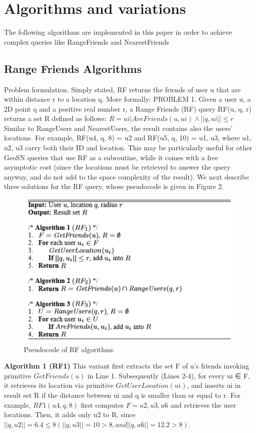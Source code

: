 \documentclass[prodmode,acmtods]{acmsmall} %
\begin{document}
\section{Algorithms and variations}
The following algorithms are implemented in this paper in order to achieve complex queries like RangeFriends and NearestFriends

\subsection{Range Friends Algorithms}
Problem formulation. Simply stated, RF returns the friends of
user u that are within distance r to a location q. More formally:
PROBLEM 1. Given a user u, a 2D point q and a positive real
number r, a Range Friends (RF) query RF(u, q, r) returns a set
R defined as follows:
\newline
\newline
$  R = {ui | AreFriends(u, ui) ∧ ||q, ui|| ≤ r} $
\newline
\newline
Similar to RangeUsers and NearestUsers, the result contains
also the users’ locations. For example, RF(u4, q, 8) = {u2} and
RF(u5, q, 10) = {u1, u3}, where u1, u2, u3 carry both their ID
and location. This may be particularly useful for other GeoSN
queries that use RF as a subroutine, while it comes with a free
asymptotic cost (since the locations must be retrieved to answer the
query anyway, and do not add to the space complexity of the result).
We next describe three solutions for the RF query, whose pseudocode
is given in Figure 2.

\begin{figure}[h]
\centering
\includegraphics[width=0.7\linewidth]{./graphics/RF_algorithm}
\caption{Pseudocode of RF algorithms}
\label{fig:RF_algorithm}
\end{figure}


\textbf{Algorithm 1 (RF1)}
\newline
This variant first extracts the set F of u's
friends invoking primitive $GetFriends(u)$ in Line 1. Subsequently
(Lines 2-4), for every ui ∈ F, it retrieves its location via primitive
$GetUserLocation(ui)$, and inserts ui in result set R if the distance
between ui and q is smaller than or equal to r. For example,
$RF1(u4, q, 8)$ first computes $F = {u2, u3, u6}$ and retrieves the
user locations. Then, it adds only u2 to R, since $||q, u2|| = 6.4 ≤ 8
(||q, u3|| = 10 > 8, and ||q, u6|| = 12.2 > 8)$.
\end{document}
